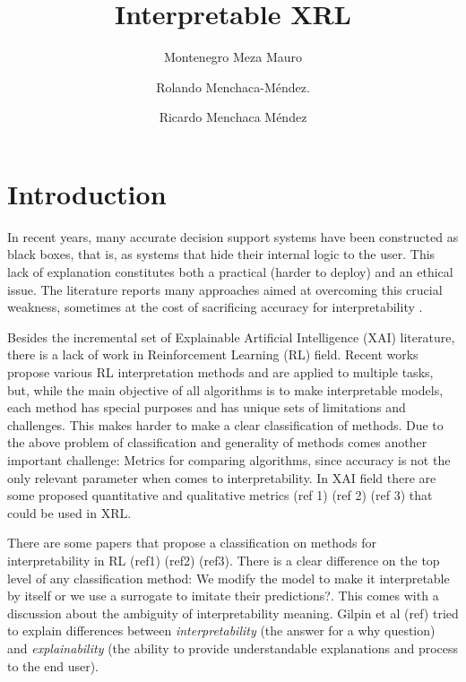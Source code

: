 \documentclass[runningheads]{llncs}
\begin{document}
%
\title{Interpretable XRL}

\author{Montenegro Meza Mauro  \and
Rolando Menchaca-Méndez. \and
Ricardo Menchaca Méndez}

%
\maketitle              
%
\begin{abstract}


\end{abstract}

\section{Introduction}

In recent years, many accurate decision support systems have been constructed as black boxes, that is, as systems that hide their internal logic to the user. This lack of explanation constitutes both a practical (harder to deploy) and an ethical issue. The literature reports many approaches aimed at overcoming this crucial weakness, sometimes at the cost of sacrificing accuracy for interpretability \cite{johansson2011trade}.

Besides the incremental set of Explainable Artificial Intelligence (XAI) literature, there is a lack of work in Reinforcement Learning (RL) field. Recent works propose various RL interpretation methods and are applied to multiple tasks, but, while the main objective of all algorithms is to make interpretable models, each method has special purposes and has unique sets of limitations and challenges. This makes harder to make a clear classification of methods. Due to the above problem of classification and generality of methods comes another important challenge: Metrics for comparing algorithms, since accuracy is not the only relevant parameter when comes to interpretability. In XAI field there are some proposed quantitative and qualitative metrics (ref 1) (ref 2) (ref 3) that could be used in XRL.

There are some papers that propose a classification on methods for interpretability in RL (ref1) (ref2) (ref3). There is a clear difference on the top level of any classification method: We modify the model to make it interpretable by itself or we use a surrogate to imitate their predictions?. This comes with a discussion about the ambiguity of interpretability meaning. Gilpin et al (ref) tried to explain differences between \textit{interpretability} (the answer for a why question) and \textit{explainability} (the ability to provide understandable explanations and process to the end user).
\end{document}
